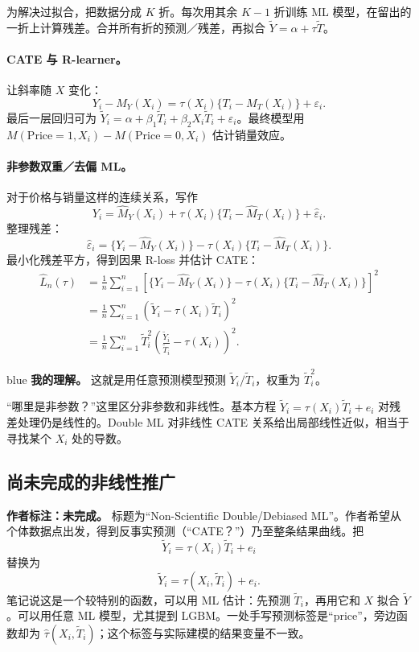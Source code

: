 {为解决过拟合，把数据分成 $K$ 折。每次用其余 $K-1$ 折训练 ML 模型，在留出的一折上计算残差。合并所有折的预测／残差，再拟合 $\widetilde Y=\alpha+\tau\widetilde T$。

\paragraph{CATE 与 R-learner。}
让斜率随 $X$ 变化：
\[Y_i-M_Y(X_i)=\tau(X_i)\{T_i-M_T(X_i)\}+\varepsilon_i.\]
最后一层回归可为 $\widetilde Y_i=\alpha+\beta_1\widetilde T_i+\beta_2X_i\widetilde T_i+\varepsilon_i$。最终模型用 $M(\mathrm{Price}=1,X_i)-M(\mathrm{Price}=0,X_i)$ 估计销量效应。

\paragraph{非参数双重／去偏 ML。}
对于价格与销量这样的连续关系，写作
\[Y_i=\hat M_Y(X_i)+\tau(X_i)\{T_i-\hat M_T(X_i)\}+\hat\varepsilon_i.\]
整理残差：
\[\hat\varepsilon_i=\{Y_i-\hat M_Y(X_i)\}-\tau(X_i)\{T_i-\hat M_T(X_i)\}.\]
最小化残差平方，得到因果 R-loss 并估计 CATE：
\begin{align*}
\hat L_n(\tau)&=\frac1n\sum_{i=1}^n\left[\{Y_i-\hat M_Y(X_i)\}-\tau(X_i)\{T_i-\hat M_T(X_i)\}\right]^2\\
&=\frac1n\sum_{i=1}^n(\widetilde Y_i-\tau(X_i)\widetilde T_i)^2\\
&=\frac1n\sum_{i=1}^n\widetilde T_i^2\left(\frac{\widetilde Y_i}{\widetilde T_i}-\tau(X_i)\right)^2.
\end{align*}
\begin{inkblock}{blue}
\textbf{我的理解。} 这就是用任意预测模型预测 $\widetilde Y_i/\widetilde T_i$，权重为 $\widetilde T_i^2$。
\end{inkblock}

“哪里是非参数？”这里区分非参数和非线性。基本方程 $\widetilde Y_i=\tau(X_i)\widetilde T_i+e_i$ 对残差处理仍是线性的。Double ML 对非线性 CATE 关系给出局部线性近似，相当于寻找某个 $X_i$ 处的导数。

\subsection{尚未完成的非线性推广}
\textbf{作者标注：未完成。} 标题为“Non-Scientific Double/Debiased ML”。作者希望从个体数据点出发，得到反事实预测（“CATE？”）乃至整条结果曲线。把
\[\widetilde Y_i=\tau(X_i)\widetilde T_i+e_i\]
替换为
\[\widetilde Y_i=\tau(X_i,\widetilde T_i)+e_i.\]
笔记说这是一个较特别的函数，可以用 ML 估计：先预测 $\widetilde T_i$，再用它和 $X$ 拟合 $\widetilde Y$。可以用任意 ML 模型，尤其提到 LGBM。一处手写预测标签是“price”，旁边函数却为 $\hat\tau(X_i,\widetilde T_i)$；这个标签与实际建模的结果变量不一致。

}
